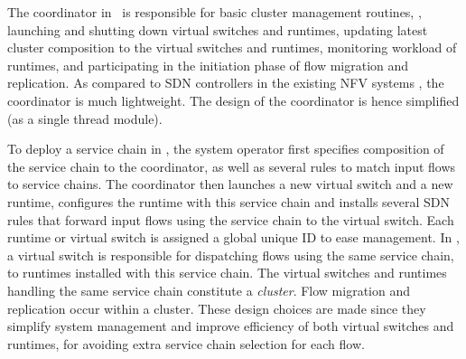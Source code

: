 The coordinator in \nfactor~is responsible for basic cluster management routines, %
\eg, launching and shutting down virtual switches and runtimes, updating latest cluster composition to the virtual switches and runtimes, monitoring workload of runtimes, %
 and participating in the initiation phase of flow migration and replication.
As compared to SDN controllers in the existing NFV systems \cite{gember2015opennf, rajagopalan2013split}, 
 the coordinator is much lightweight. %
The design of the coordinator is hence simplified (as a single thread module). %





To deploy a service chain in \nfactor, the system operator first specifies composition of the service chain to the coordinator, as well as several rules to match input flows to service chains. The coordinator then launches a new virtual switch and a new runtime, configures the runtime with this service chain and installs several SDN rules that forward input flows using the service chain to the virtual switch. %
Each runtime or virtual switch is assigned a global unique ID to ease management.  In \nfactor, a virtual switch is responsible for dispatching flows using the same service chain, to runtimes installed with this service chain. The virtual switches and runtimes handling the same service chain constitute a {\em cluster}. Flow migration and replication occur within a cluster. These design choices are made since they simplify system management and improve efficiency of both virtual switches and runtimes, for avoiding extra service chain selection for each flow.



